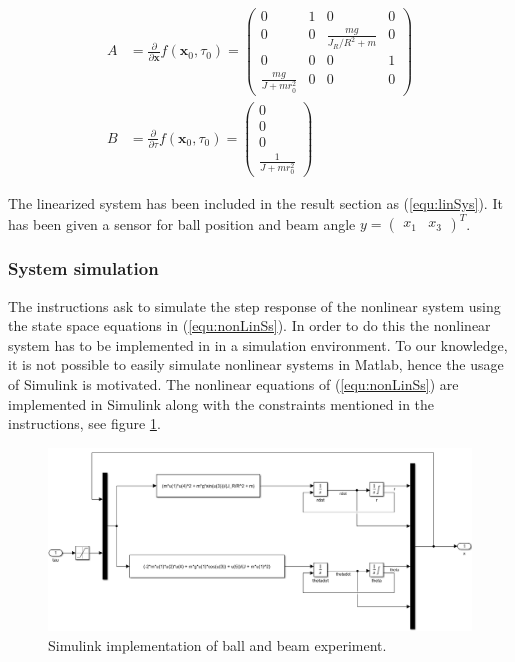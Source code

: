 \documentclass[a4paper, titlepage]{article}
\begin{document}
\begin{equation}
\begin{split}
A &= \frac{\partial}{\partial \textbf{x}}f(\textbf{x}_0, \tau_0) = 
\begin{pmatrix}
0 & 1 & 0 & 0 \\
0 & 0 & \frac{mg}{J_R/R^2 + m} & 0 \\
0 & 0 & 0 & 1 \\
\frac{mg}{J + mr_0^2} & 0 & 0 & 0
\end{pmatrix} \\
B &= \frac{\partial}{\partial \tau}f(\textbf{x}_0, \tau_0) = 
\begin{pmatrix}
0 \\ 0 \\ 0 \\ \frac{1}{J + mr_0^2}
\end{pmatrix}
\end{split}
\end{equation}

The linearized system has been included in the result section as (\ref{equ:linSys}).
It has been given a sensor for ball position and beam angle $y = \begin{pmatrix} x_1 & x_3 \end{pmatrix}^T$.

\subsubsection{System simulation}
The instructions ask to simulate the step response of the nonlinear system using the state space equations in (\ref{equ:nonLinSs}).
In order to do this the nonlinear system has to be implemented in in a simulation environment.
To our knowledge, it is not possible to easily simulate nonlinear systems in Matlab, hence the usage of Simulink is motivated.
The nonlinear equations of (\ref{equ:nonLinSs}) are implemented in Simulink along with the constraints mentioned in the instructions, see figure \ref{fig:ballBeamSimulink}.

\begin{figure}[h!]
\center
\includegraphics[scale=0.4]{../figures/ballBeamSimulink.png}
\caption{Simulink implementation of ball and beam experiment.}
\label{fig:ballBeamSimulink}
\end{figure}
\end{document}
